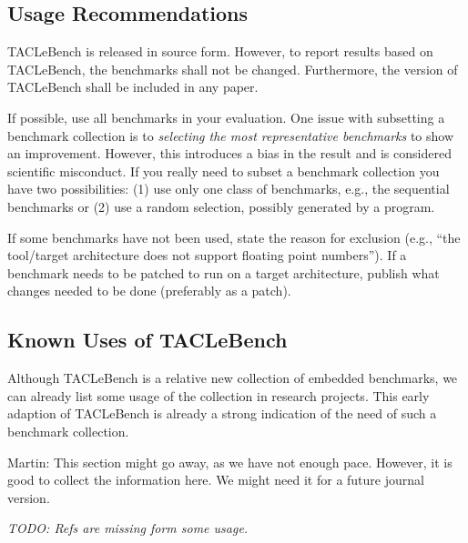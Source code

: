 \documentclass[a4paper,UKenglish]{oasics}
\newcommand{\todo}[1]{{\emph{TODO: #1}}}
\newcommand{\martin}[1]{{\color{blue} Martin: #1}}
\begin{document}
\subsection{Usage Recommendations}
\label{usage}

TACLeBench is released in source form. However, to report
results based on TACLeBench, the benchmarks shall not be changed.
Furthermore, the version of TACLeBench shall be included in any paper.

If possible, use all benchmarks in your evaluation. One issue with subsetting
a benchmark collection is to \emph{selecting the most representative benchmarks}
to show an improvement. However, this introduces a bias in the result and
is considered scientific misconduct. If you really need to subset a benchmark collection you have
two possibilities: (1) use only one class of benchmarks, e.g., the sequential
benchmarks or (2) use a random selection, possibly generated by a program.

If some benchmarks have not been used, state the reason for exclusion
(e.g., ``the tool/target architecture does not support floating point numbers'').
If a benchmark needs to be patched to run on a target architecture,
publish what changes needed to be done (preferably as a patch).


\subsection{Known Uses of TACLeBench}

Although TACLeBench is a relative new collection of embedded benchmarks,
we can already list some usage of the collection in research projects.
This early adaption of TACLeBench is already a strong indication of
the need of such a benchmark collection.

\martin{This section might go away, as we have not enough pace.
However, it is good to collect the information here. We might need it
for a future journal version.}

\todo{Refs are missing form some usage.}
\end{document}
